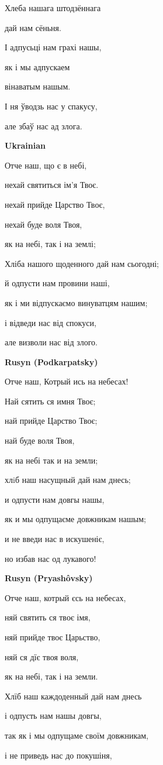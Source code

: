 Хлеба нашага штодзённага 

дай нам сёньня. 

І адпусьці нам грахі нашы, 

як і мы адпускаем 

вінаватым нашым. 

І ня ўводзь нас у спакусу, 

але збаў нас ад злога. 

\textbf{Ukrainian}

Отче наш, що є в небі,
 
нехай святиться ім'я Твоє.

нехай прийде Царство Твоє,

нехай буде воля Твоя,

як на небі, так і на землі;

Хліба нашого щоденного дай нам сьогодні;

й одпусти нам провини наші,

як і ми відпускаємо винуватцям нашим;

і відведи нас від спокуси,

але визволи нас від злого.

\textbf{Rusyn (Podkarpatsky)}

Отче наш, Котрый ись на небесах!

Най сятить ся имня Твоє;

най прийде Царство Твоє;

най буде воля Твоя,

як на небі так и на земли;

хлiб наш насущный дай нам днесь;

и одпусти нам довгы нашы,

як и мы одпущаєме довжникам нашым;

и не введи нас в искушеніє,

но избав нас од лукавого!

\textbf{Rusyn (Pryashôvsky)}

Отче наш, котрый єсь на небесах,

няй святить ся твоє імя,

няй прийде твоє Царьство,

няй ся дїє твоя воля,

як на небі, так і на земли.

Хлїб наш каждоденный дай нам днесь

і одпусть нам нашы довгы,

так як і мы одпущаме своїм довжникам,

і не приведь нас до покушіня,

